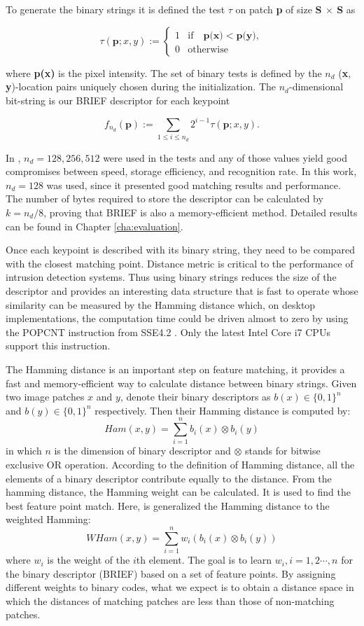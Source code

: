 To generate the binary strings it is defined the test $\tau$ on patch \textbf{p} of size \textbf{S $\times$ S} as

$$\tau(\textbf{p}; x, y) :=
\begin{cases}
  1 &\mbox{if}\quad \textbf{p(x)} < \textbf{p(y)},\\
  0 &\mbox{otherwise}
\end{cases}$$

where \textbf{p(x)} is the pixel intensity. The set of binary tests is defined by the $n_{d}$ (\textbf{x}, \textbf{y})-location pairs uniquely chosen during the initialization. The $n_{d}$-dimensional bit-string is our BRIEF descriptor for each keypoint

$$f_{n_{d}}(\textbf{p}) := \sum_{1 \le i \le n_{d}} 2^{i-1} \tau(\textbf{p}; x, y).$$

In \cite{Calonder2010}, $n_{d}= 128, 256, 512$ were used in the tests and any of those values yield good compromises between speed, storage efficiency, and recognition rate. In this work, $n_{d}= 128$ was used, since it presented good matching results and performance. The number of bytes required to store the descriptor can be calculated by $k = n_{d}/8$, proving that BRIEF is also a memory-efficient method. Detailed results can be found in Chapter \ref{cha:evaluation}.

Once each keypoint is described with its binary string, they need to be compared with the closest matching point. Distance metric is critical to the performance of intrusion detection systems. Thus using binary strings reduces the size of the descriptor and provides an interesting data structure that is fast to operate whose similarity can be measured by the Hamming distance which, on desktop implementations, the computation time could be driven almost to zero by using the POPCNT instruction from SSE4.2 \cite{Intel2007}. Only the latest Intel Core i7 CPUs support this instruction.

The Hamming distance is an important step on feature matching, it provides a fast and memory-efficient way to calculate distance between binary strings. Given two image patches $x$ and $y$, denote their binary descriptors as $b(x) \in \{0,1\}^n$ and $b(y) \in \{0,1\}^n$ respectively. Then their Hamming distance is computed by:
$$Ham(x, y)=\sum_{i=1}^{n}b_i(x)\otimes b_i(y)$$
in which $n$ is the dimension of binary descriptor and $\otimes$ stands for bitwise exclusive OR operation. According to the definition of Hamming distance, all the elements of a binary descriptor contribute equally to the distance. From the hamming distance, the Hamming weight can be calculated. It is used to find the best feature point match. Here, is generalized the Hamming distance to the weighted Hamming:
$$WHam(x, y)=\sum_{i=1}^{n}w_i(b_i(x)\otimes b_i(y))$$
where $w_i$ is the weight of the $i$th element. The goal is to learn $w_i,i=1,2\cdots,n$ for the binary descriptor (BRIEF) based on a set of feature points. By assigning different weights to binary codes, what we expect is to obtain a distance space in which the distances of matching patches are less than those of non-matching patches.

